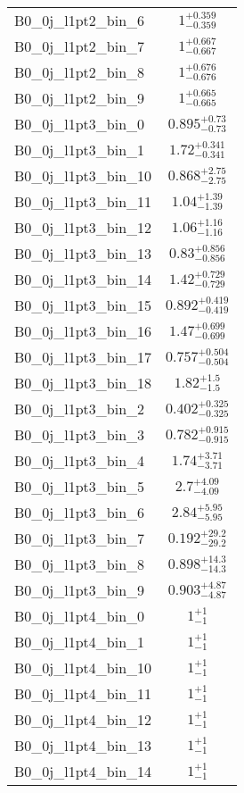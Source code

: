 \begin{tabular}{|l|c|}
B0\_0j\_l1pt2\_bin\_6 & $1^{+0.359}_{-0.359}$ \\
B0\_0j\_l1pt2\_bin\_7 & $1^{+0.667}_{-0.667}$ \\
B0\_0j\_l1pt2\_bin\_8 & $1^{+0.676}_{-0.676}$ \\
B0\_0j\_l1pt2\_bin\_9 & $1^{+0.665}_{-0.665}$ \\
B0\_0j\_l1pt3\_bin\_0 & $0.895^{+0.73}_{-0.73}$ \\
B0\_0j\_l1pt3\_bin\_1 & $1.72^{+0.341}_{-0.341}$ \\
B0\_0j\_l1pt3\_bin\_10 & $0.868^{+2.75}_{-2.75}$ \\
B0\_0j\_l1pt3\_bin\_11 & $1.04^{+1.39}_{-1.39}$ \\
B0\_0j\_l1pt3\_bin\_12 & $1.06^{+1.16}_{-1.16}$ \\
B0\_0j\_l1pt3\_bin\_13 & $0.83^{+0.856}_{-0.856}$ \\
B0\_0j\_l1pt3\_bin\_14 & $1.42^{+0.729}_{-0.729}$ \\
B0\_0j\_l1pt3\_bin\_15 & $0.892^{+0.419}_{-0.419}$ \\
B0\_0j\_l1pt3\_bin\_16 & $1.47^{+0.699}_{-0.699}$ \\
B0\_0j\_l1pt3\_bin\_17 & $0.757^{+0.504}_{-0.504}$ \\
B0\_0j\_l1pt3\_bin\_18 & $1.82^{+1.5}_{-1.5}$ \\
B0\_0j\_l1pt3\_bin\_2 & $0.402^{+0.325}_{-0.325}$ \\
B0\_0j\_l1pt3\_bin\_3 & $0.782^{+0.915}_{-0.915}$ \\
B0\_0j\_l1pt3\_bin\_4 & $1.74^{+3.71}_{-3.71}$ \\
B0\_0j\_l1pt3\_bin\_5 & $2.7^{+4.09}_{-4.09}$ \\
B0\_0j\_l1pt3\_bin\_6 & $2.84^{+5.95}_{-5.95}$ \\
B0\_0j\_l1pt3\_bin\_7 & $0.192^{+29.2}_{-29.2}$ \\
B0\_0j\_l1pt3\_bin\_8 & $0.898^{+14.3}_{-14.3}$ \\
B0\_0j\_l1pt3\_bin\_9 & $0.903^{+4.87}_{-4.87}$ \\
B0\_0j\_l1pt4\_bin\_0 & $1^{+1}_{-1}$ \\
B0\_0j\_l1pt4\_bin\_1 & $1^{+1}_{-1}$ \\
B0\_0j\_l1pt4\_bin\_10 & $1^{+1}_{-1}$ \\
B0\_0j\_l1pt4\_bin\_11 & $1^{+1}_{-1}$ \\
B0\_0j\_l1pt4\_bin\_12 & $1^{+1}_{-1}$ \\
B0\_0j\_l1pt4\_bin\_13 & $1^{+1}_{-1}$ \\
B0\_0j\_l1pt4\_bin\_14 & $1^{+1}_{-1}$ \\

\end{tabular}
